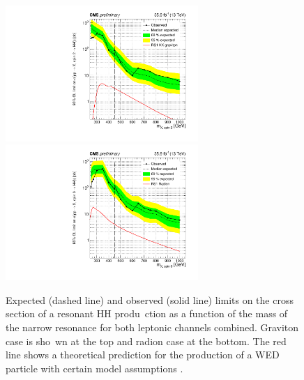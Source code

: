 \begin{figure}[!htb]%
  \begin{center}
    \includegraphics[width=0.65\textwidth]{figures/limitHH_Nov16_graviton.pdf}
    \includegraphics[width=0.65\textwidth]{figures/limitHH_Nov16_radion.pdf}
    \caption{ Expected (dashed line) and observed (solid line) limits on the cross section of a resonant HH produ\
ction
      as a function of the mass of the narrow resonance for both leptonic channels combined. Graviton case is sho\
wn at the top and radion case at the bottom. The red line shows a theoretical prediction for
      the production of a WED particle with certain model assumptions \cite{Oliveira:2014kla}.
      }


    \label{fig:HHlimits} %
  \end{center}
\end{figure}




